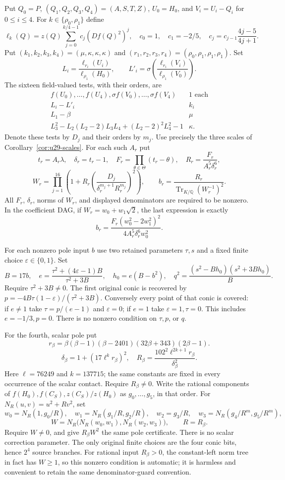 \documentclass[11pt,a4paper]{article}
\theoremstyle{definition}
\theoremstyle{remark}
\begin{document}
Put $Q_0=P$, $(Q_1,Q_2,Q_3,Q_4)=(A,S,T,Z)$,
$U_0=H_0$, and $V_i=U_i-Q_i$ for $0\le i\le4$.
For $k\in\{\rho_0,\rho_1\}$ define
\[
 \ell_k(Q)=z(Q)\sum_{j=0}^{k/4-1}c_j(Df(Q)^2)^j,
 \quad c_0=1,\quad c_1=-2/5,\quad
 c_j=c_{j-1}\frac{4j-5}{4j+1}.
\]
Put $(k_1,k_2,k_3,k_4)=(\mu,\kappa,\kappa,\kappa)$ and
$(r_1,r_2,r_3,r_4)=(\rho_0,\rho_1,\rho_1,\rho_1)$.  Set
\[
 L_i=\frac{\ell_{r_i}(U_i)}{\ell_{\rho_1}(H_0)},\qquad
 L'_i=\sigma\left(\frac{\ell_{r_i}(V_i)}{\ell_{\rho_1}(V_0)}\right).
\]
The sixteen field-valued tests, with their orders, are
\[
 \begin{array}{c|c}
 f(U_0),\ldots,f(U_4),\sigma f(V_0),\ldots,\sigma f(V_4)&1\text{ each}\\
 L_i-L'_i&k_i\\
 L_1-\beta&\mu\\
 L_3^2-L_2(L_2-2)L_3L_4+(L_2-2)^2L_4^2-1&\kappa.
 \end{array}
\]
Denote these tests by $D_j$ and their orders by $m_j$.
Use precisely the three scales of Corollary~\ref{cor:u29-scales}.
For each such $A_r$ put
\[
 t_r=A_r\lambda,\quad \delta_r=t_r-1,\quad
 F_r=\prod_{\theta\in\Theta}(t_r-\theta),\quad
 R_r=\frac{F_r}{A_r^5\delta_r^6},
\]
\[
 W_r=\prod_{j=1}^{16}
 \left(1+R_r\left(\frac{D_j}{\delta_r^{m_j+1}R_r^{m_j}}\right)^2\right),
 \qquad b_r=\frac{R_r}{\operatorname{Tr}_{K/\mathbb Q}(W_r^{-1})^2}.
\]
All $F_r$, $\delta_r$, norms of $W_r$, and displayed denominators
are required to be nonzero.  In the coefficient DAG, if
$W_r=w_0+w_1\sqrt2$, the last expression is exactly
\[
 b_r=\frac{F_r(w_0^2-2w_1^2)^2}
              {4A_r^5\delta_r^6w_0^2}.
\]

For each nonzero pole input $b$ use two retained parameters $\tau,s$
and a fixed finite choice $\varepsilon\in\{0,1\}$.  Set
\[
 B=17b,\quad e=\frac{\tau^2+(4\varepsilon-1)B}{\tau^2+3B},
 \quad h_0=e(B-b^2),\quad
 q^2=\frac{(s^2-Bh_0)(s^2+3Bh_0)}{B}.
\]
Require $\tau^2+3B\ne0$.  The first original conic is recovered by
$p=-4B\tau(1-\varepsilon)/(\tau^2+3B)$.
Conversely every point of that conic is covered: if $e\ne1$ take
$\tau=p/(e-1)$ and $\varepsilon=0$; if $e=1$ take
$\varepsilon=1,\tau=0$.  This includes $e=-1/3,p=0$.
There is no nonzero condition on $\tau,p$, or $q$.

For the fourth, scalar pole put
\[
 r_\beta=\beta(\beta-1)(\beta-2401)(32\beta+343)(2\beta-1).
\]
\[
 \delta_\beta=1+(17\ell^k r_\beta)^2,\quad
 R_\beta=\frac{102^2\ell^{2k+1}r_\beta}{\delta_\beta^2}.
\]
Here $\ell=76249$ and $k=137715$; the same constants are fixed in
every occurrence of the scalar contact.
Require $R_\beta\ne0$.  Write the rational components of
$f(H_0),f(C_S),z(C_S)/z(H_0)$ as $g_0,\ldots,g_5$, in that order.
For $N_R(u,v)=u^2+Rv^2$, set
\[
 w_0=N_R(1,g_0/R),\quad
 w_1=N_R(g_1/R,g_2/R),\quad w_2=g_3/R,
 \quad w_3=N_R(g_4/R^m,g_5/R^m),
\]
\[
              W=N_R\bigl(N_R(w_0,w_1),N_R(w_2,w_3)\bigr),
              \qquad R=R_\beta.
\]
Require $W\ne0$, and give $R_\beta W^2$ the same pole certificate.
There is no scalar correction parameter.  The only original finite
choices are the four conic bits, hence $2^4$ source branches.
For rational input $R_\beta>0$, the constant-left norm tree in fact
has $W\ge1$, so this nonzero condition is automatic; it is harmless
and convenient to retain the same denominator-guard convention.
\end{document}
